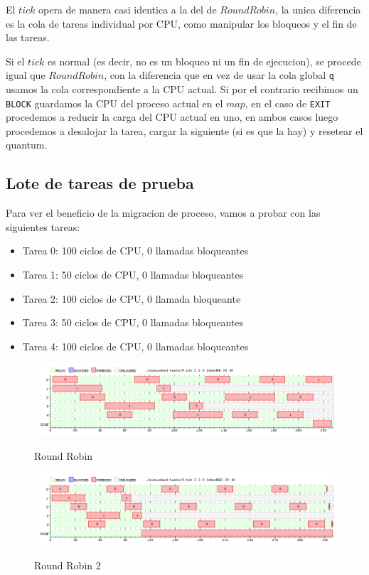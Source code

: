 El $tick$ opera de manera casi identica a la del de $Round Robin$, la unica diferencia es la cola de tareas individual por CPU, como manipular los bloqueos y el fin de las tareas.

Si el $tick$ es normal (es decir, no es un bloqueo ni un fin de ejecucion), se procede igual que $Round Robin$, con la diferencia que en vez de usar la cola global \texttt{q} usamos la cola correspondiente a la CPU actual. Si por el contrario recibimos un \texttt{BLOCK} guardamos la CPU del proceso actual en el $map$, en el caso de \texttt{EXIT} procedemos a reducir la carga del CPU actual en uno, en ambos casos luego procedemos a desalojar la tarea, cargar la siguiente (si es que la hay) y resetear el quantum.

\subsection{Lote de tareas de prueba}

Para ver el beneficio de la migracion de proceso, vamos a probar con las siguientes tareas:

\begin{itemize}
	\item Tarea 0: 100 ciclos de CPU, 0 llamadas bloqueantes
	\item Tarea 1: 50 ciclos de CPU, 0 llamadas bloqueantes
	\item Tarea 2: 100 ciclos de CPU, 0 llamada bloqueante
	\item Tarea 3: 50 ciclos de CPU, 0 llamadas bloqueantes
	\item Tarea 4: 100 ciclos de CPU, 0 llamadas bloqueantes
\end{itemize}

\begin{figure}[h]
    \includegraphics[width=\linewidth]{images/8_quantumRR.png}
    \label{fig:Task Consola}
    \caption{Round Robin}
\end{figure}

\begin{figure}[h]
    \includegraphics[width=\linewidth]{images/8_quantumRR2.png}
    \label{fig:Task Consola}
    \caption{Round Robin 2}
\end{figure}

